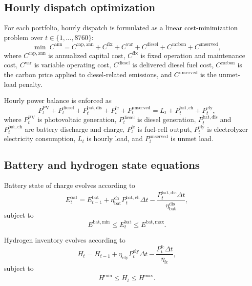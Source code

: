 \documentclass[preprint,12pt]{elsarticle}
\begin{document}
\subsection{Hourly dispatch optimization}

For each portfolio, hourly dispatch is formulated as a linear cost-minimization problem over $t \in \{1,\dots,8760\}$:
\begin{equation}
\min \; C^{\mathrm{ann}}
=
C^{\mathrm{cap,ann}} + C^{\mathrm{fix}} + C^{\mathrm{var}} + C^{\mathrm{diesel}} + C^{\mathrm{carbon}} + C^{\mathrm{unserved}},
\end{equation}
where $C^{\mathrm{cap,ann}}$ is annualized capital cost, $C^{\mathrm{fix}}$ is fixed operation and maintenance cost, $C^{\mathrm{var}}$ is variable operating cost, $C^{\mathrm{diesel}}$ is delivered diesel fuel cost, $C^{\mathrm{carbon}}$ is the carbon price applied to diesel-related emissions, and $C^{\mathrm{unserved}}$ is the unmet-load penalty.

Hourly power balance is enforced as
\begin{equation}
P^{\mathrm{PV}}_t + P^{\mathrm{diesel}}_t + P^{\mathrm{bat,dis}}_t + P^{\mathrm{fc}}_t + P^{\mathrm{unserved}}_t
=
L_t + P^{\mathrm{bat,ch}}_t + P^{\mathrm{ely}}_t,
\end{equation}
where $P^{\mathrm{PV}}_t$ is photovoltaic generation, $P^{\mathrm{diesel}}_t$ is diesel generation, $P^{\mathrm{bat,dis}}_t$ and $P^{\mathrm{bat,ch}}_t$ are battery discharge and charge, $P^{\mathrm{fc}}_t$ is fuel-cell output, $P^{\mathrm{ely}}_t$ is electrolyzer electricity consumption, $L_t$ is hourly load, and $P^{\mathrm{unserved}}_t$ is unmet load.

\subsection{Battery and hydrogen state equations}

Battery state of charge evolves according to
\begin{equation}
E^{\mathrm{bat}}_t
=
E^{\mathrm{bat}}_{t-1}
+ \eta^{\mathrm{ch}}_{\mathrm{bat}} P^{\mathrm{bat,ch}}_t \Delta t
-
\frac{P^{\mathrm{bat,dis}}_t \Delta t}{\eta^{\mathrm{dis}}_{\mathrm{bat}}},
\end{equation}
subject to
\begin{equation}
E^{\mathrm{bat,min}} \le E^{\mathrm{bat}}_t \le E^{\mathrm{bat,max}}.
\end{equation}

Hydrogen inventory evolves according to
\begin{equation}
H_t
=
H_{t-1}
+ \eta_{\mathrm{ely}} P^{\mathrm{ely}}_t \Delta t
-
\frac{P^{\mathrm{fc}}_t \Delta t}{\eta_{\mathrm{fc}}},
\end{equation}
subject to
\begin{equation}
H^{\min} \le H_t \le H^{\max}.
\end{equation}
\end{document}

